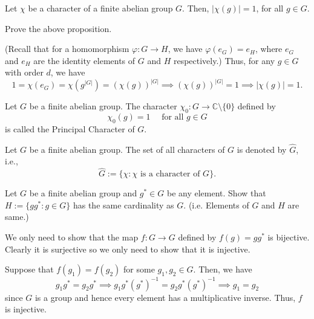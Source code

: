 \documentclass{elegantbook}
\begin{document}
\begin{proposition} \label{prop:character_modulus_1}
  Let $\chi$ be a character of a finite abelian group $G$. Then, $|\chi(g)|=1$, for all $g\in G$.
\end{proposition}

\begin{exercise}
  Prove the above proposition.
\end{exercise}

\begin{solution}
    (Recall that for a homomorphism $\varphi:G\to H$, we have $\varphi(e_G)=e_H$, where $e_G$ and $e_H$ are the identity elements of $G$ and $H$ respectively.) Thus, for any $g\in G$ with order $d$, we have
    \[
      1 = \chi(e_G) = \chi(g^{|G|}) = (\chi(g))^{|G|} \implies (\chi(g))^{|G|} = 1 \implies |\chi(g)| = 1.
    \]
\end{solution}

\begin{definition}
  Let $G$ be a finite abelian group. The character $\chi_0:G\to \mathbb{C}\setminus\{0\}$ defined by
  \[
    \chi_0(g) = 1 \quad \text{ for all } g \in G
  \]
  is called the Principal Character of $G$.
\end{definition}

\begin{definition}
  Let $G$ be a finite abelian group. The set of all characters of $G$ is denoted by $\widehat{G}$, i.e.,
  \[
    \widehat{G} := \{ \chi : \chi \text{ is a character of } G \}.
  \]
\end{definition}

\begin{exercise} \label{ex:left-translation-bijection}
  Let $G$ be a finite abelian group and $g^*\in G$ be any element. Show that $H := \{ gg^* : g \in G \}$ has the same cardinality as $G$. (i.e. Elements of $G$ and $H$ are same.)
\end{exercise}

\begin{solution}
  We only need to show that the map $f:G\to G$ defined by $f(g) = gg^*$ is bijective. Clearly it is surjective so we only need to show that it is injective.

  Suppose that $f(g_1) = f(g_2)$ for some $g_1,g_2\in G$. Then, we have
  \[
    g_1 g^* = g_2 g^* \implies g_1g^* (g^*)^{-1} = g_2 g^* (g^*)^{-1} \implies g_1 = g_2
  \]
  since $G$ is a group and hence every element has a multiplicative inverse. Thus, $f$ is injective.
\end{solution}
\end{document}

